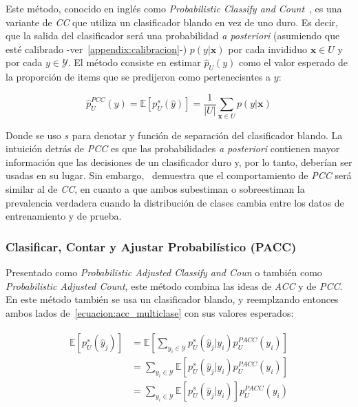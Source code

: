 Este método, conocido en inglés como {\it Probabilistic Classify and
Count\/}~\cite{bella2010quantification, tang2010network}, es una variante de
{\it CC\/} que utiliza un clasificador blando en vez de uno duro. Es decir, que
la salida del clasificador será una probabilidad {\it a posteriori\/} (asumiendo
que esté calibrado -ver~\ref{appendix:calibracion}-) $p(y|\mathbf{x})$ por cada
invididuo $\mathbf{x} \in U$ y por cada $y \in \mathcal{Y}$. El método consiste
en estimar $\hat p_{U}(y)$ como el valor esperado de la proporción de items que
se predijeron como pertenecisntes a $y$:

\begin{equation}
    \hat p^{PCC}_{U}(y) = \mathbb{E}[p_{U}^{s}(\hat y)] = \frac{1}{|U|}\sum_{\mathbf{x} \in U}{p(y|\mathbf{x})}
\end{equation}

Donde se uso $s$ para denotar y función de separación del clasificador blando.
La intuición detrás de {\it PCC\/} es que las probabilidades {\it a
posteriori\/} contienen mayor información que las decisiones de un clasificador
duro y, por lo tanto, deberían ser usadas en su lugar. Sin
embargo,~\citet[Corolario 6, p. 157 y p.163]{tasche2014exact} demuestra que el
comportamiento de {\it PCC\/} será similar al de {\it CC}, en cuanto a que ambos
subestiman o sobreestiman la prevalencia verdadera cuando la distribución de
clases cambia entre los datos de entrenamiento y de prueba.

\subsubsection{Clasificar, Contar y Ajustar Probabilístico (PACC)}

Presentado como {\it Probabilistic Adjusted Classify and Coun\/} o también como
{\it Probabilistic Adjusted Count}, este método combina las ideas de {\it ACC\/}
y de {\it PCC}. En este método también se usa un clasificador blando, y
reemplzando entonces ambos lados de~\ref{ecuacion:acc_multiclase} con sus
valores esperados:

\begin{align}
\begin{split}
    \mathbb{E}[p_{U}^{s}(\hat y_j)] &= \mathbb{E}[\sum _{y_i\in {\mathcal {Y}}}{p^{s}_{U}(\hat y_j|y_i)p^{PACC}_U(y_i)}] \\
    &= \sum _{y_i\in {\mathcal {Y}}}{\mathbb{E}[p^{s}_{U}(\hat y_j|y_i)p^{PACC}_U(y_i)]} \\
    &= \sum _{y_i\in {\mathcal {Y}}}{\mathbb{E}[p^{s}_{U}(\hat y_j|y_i)]p^{PACC}_U(y_i)}
\end{split}
\end{align}

